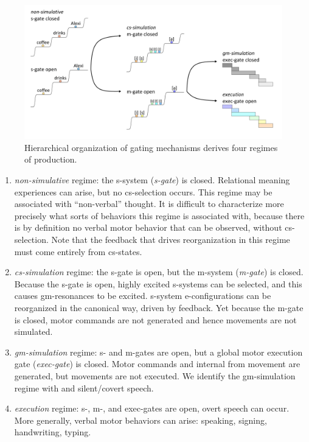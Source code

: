   
\begin{figure}
\includegraphics[width=\textwidth]{figures/Tilsen-img56.png}
\caption{Hierarchical organization of gating mechanisms derives four regimes of production.}
\label{fig:4:6}
\end{figure}
 
\begin{enumerate}
\item \textit{non-simulative} regime: the s-system  (\textit{s-gate}) is closed. Relational meaning experiences can arise, but no cs-selection occurs. This regime may be associated with “non-verbal” thought. It is difficult to characterize more precisely what sorts of behaviors this regime is associated with, because there is by definition no verbal motor behavior that can be observed, without cs-selection. Note that the feedback that drives reorganization in this regime must come entirely from cs-states.

\item \textit{cs-simulation} regime: the s-gate is open, but the m-sys\-tem  (\textit{m-gate}) is closed. Because the s-gate is open, highly excited s-systems can be selected, and this causes gm-resonances to be excited. s-system e-configurations can be reorganized in the canonical way, driven by feedback. Yet because the m-gate is closed, motor commands are not generated and hence movements are not simulated. 

\item \textit{gm-simulation} regime: s- and m-gates are open,  but a global motor execution gate (\textit{exec-gate}) is closed. Motor commands and internal  from movement are generated, but movements are not executed. We identify the gm-simulation regime with  and silent/covert speech. 

\item \textit{execution} regime: s-, m-, and exec-gates are open, overt speech can occur. More generally, verbal motor behaviors can arise: speaking, signing, handwriting, typing.
\end{enumerate}

